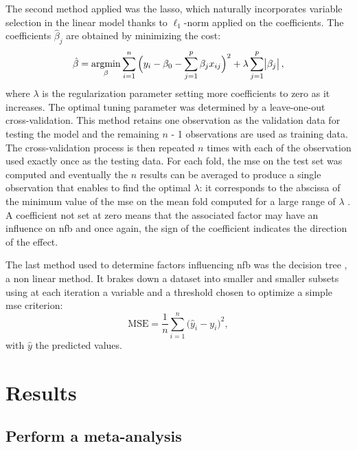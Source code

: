 \documentclass[12pt,a4paper,english]{article}
\DeclareMathOperator*{\argmin}{argmin}
\begin{document}
The second method applied was the \gls{lasso}, which naturally incorporates variable selection 
in the linear model thanks to $\ell_1$-norm applied on the coefficients. The coefficients $\hat{\beta}_j$ are obtained by minimizing the cost:
\begin{equation}
\label{eq:factors_lasso-minimization}
\hat{\beta} = \argmin_\beta \sum_{i=1}^{n} \Big(y_i - \beta_{0} - \sum_{j=1}^{p}\beta_{j}x_{ij}\Big)^2 + \lambda \sum_{j=1}^{p}\abs{\beta_{j}},
\end{equation} 
where $\lambda$ is the regularization parameter setting more coefficients to zero as it increases. The optimal tuning parameter was determined 
by a leave-one-out cross-validation. This method retains one observation as the validation data for testing the model and the 
remaining $n$ - 1 observations are used as training data. The cross-validation process is then repeated $n$ times with each of the observation 
used exactly once as the testing data. For each fold, the \gls{mse} on the test set was computed and eventually the $n$ results can 
be averaged to produce a single observation that enables to find the optimal $\lambda$: it corresponds to the abscissa of the minimum
value of the \gls{mse} on the mean fold computed for a large range of $\lambda$ \citep{James2013}. 
A coefficient not set at zero means that the associated factor may have an influence on \gls{nfb} and once again,
the sign of the coefficient indicates the direction of the effect.

The last method used to determine factors influencing \gls{nfb} was the decision tree \citep{Quinlan1986}, a non linear method. 
It brakes down a dataset into smaller and smaller subsets using at each iteration a variable and a threshold chosen to optimize a simple 
\gls{mse} criterion:
\begin{equation}
\label{eq:factors_decision_tree_mse}
\text{MSE} = \frac{1}{n}\sum_{i=1}^{n} \Big(\hat{y}_i - {y}_i\Big)^2,
\end{equation}
with $\hat{y}$ the predicted values.

\section{Results}

\subsection{Perform a meta-analysis}
\end{document}

